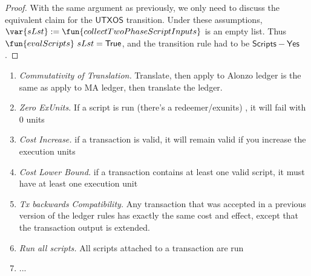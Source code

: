 \begin{property}
\begin{lemma}
\end{lemma}
\begin{proof}
  With the same argument as previously, we only need to discuss the
  equivalent claim for the $\mathsf{UTXOS}$ transition. Under these
  assumptions, $\var{sLst} := \fun{collectTwoPhaseScriptInputs}$ is an empty
  list. Thus $\fun{evalScripts}~sLst = \True$, and the transition rule
  had to be $\mathsf{Scripts{-}Yes}$.
\end{proof}
\end{property}

\begin{enumerate}
\item
  \emph{Commutativity of Translation.} Translate, then apply to Alonzo ledger is
  the same as apply to MA ledger, then translate the ledger.
\item
  \emph{Zero ExUnits.} If a script is run (there’s a redeemer/exunits) , it will fail with 0 units
\item
  \emph{Cost Increase.} if a transaction is valid, it will remain valid if you increase the execution units
\item
  \emph{Cost Lower Bound.} if a transaction contains at least one valid script, it must have at least one execution unit
\item
  \emph{Tx backwards Compatibility.} Any transaction that was accepted in a previous version of the ledger rules
    has exactly the same cost and effect, except that the transaction output is extended.
\item \emph{Run all scripts.} All scripts attached to a transaction are run
\item
  ... 
\end{enumerate}
